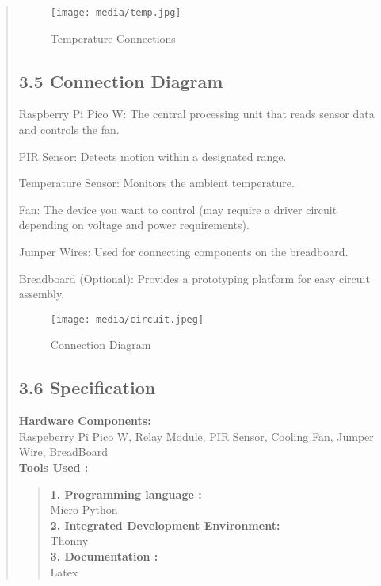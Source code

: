 \documentclass[12pt]{report}
\begin{document}
\begin{quote}
		\begin{figure}
			\centering
			\texttt{[image: media/temp.jpg]}\\
			\caption{Temperature Connections}
		\end{figure}
		
		\clearpage
		
		
		
		\subsection{3.5 Connection Diagram}
		Raspberry Pi Pico W: The central processing unit that reads sensor data and controls the fan.
		
		PIR Sensor: Detects motion within a designated range.
		
		Temperature Sensor: Monitors the ambient temperature.
		
		Fan: The device you want to control (may require a driver circuit depending on voltage and power requirements).
		
		Jumper Wires: Used for connecting components on the breadboard.
		
		Breadboard (Optional): Provides a prototyping platform for easy circuit assembly.
		\begin{figure}
			\centering
				\hspace*{-1.5cm}
			\texttt{[image: media/circuit.jpeg]}\\
			\caption{Connection Diagram}
		\end{figure}
		
		\clearpage
	
		\subsection{3.6 Specification}
		\textbf{Hardware Components: }\\
		Raspeberry Pi Pico W, Relay Module, PIR Sensor, Cooling Fan, Jumper
		Wire, BreadBoard\\
		\vspace{0.3cm}
		\textbf{Tools Used : }\\
		\begin{quote}
			\textbf{1. Programming language :}\\Micro Python \\
			\vspace{0.2cm}
			\textbf{2. Integrated Development Environment: }\\Thonny\\
			\vspace{0.2cm}
			\textbf{3. Documentation :}\\Latex\\
		\end{quote}
	\clearpage
 \end{quote}
	
\end{document}
